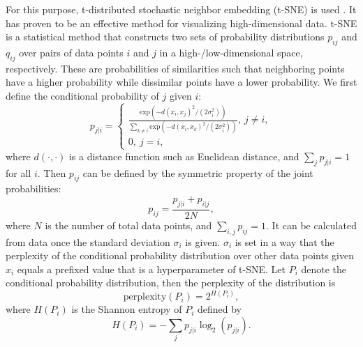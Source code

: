 \documentclass[11pt]{article}
\begin{document}
For this purpose, t-distributed stochastic neighbor embedding (t-SNE) is used \citep{van2008visualizing}. It has proven to be an effective method for visualizing high-dimensional data. t-SNE is a statistical method that constructs two sets of probability distributions $p_{ij}$ and $q_{ij}$ over pairs of data points $i$ and $j$ in a high-/low-dimensional space, respectively. These are probabilities of similarities such that neighboring points have a higher probability while dissimilar points have a lower probability. We first define the conditional probability of $j$ given $i$:
\begin{equation}
    p_{j|i}=
    \begin{cases}\frac{\mathrm{exp}(-d(x_{i},x_{j})^{2}/(2\sigma_{i}^{2}))}{\sum\limits_{k \neq i}\mathrm{exp}(-d(x_{i},x_{k})^{2}/(2\sigma_{i}^{2}))}, \ j \neq i, \\
    0, \ j=i,
    \end{cases}
\end{equation}
where $d(\cdot,\cdot)$ is a distance function such as Euclidean distance, and $\sum\limits_{j} p_{j|i}=1$ for all $i$. Then $p_{ij}$ can be defined by the symmetric property of the joint probabilities:
\begin{equation}
    p_{ij} = \frac{p_{j|i} + p_{i|j}}{2N},
\end{equation}
where $N$ is the number of total data points, and $\sum\limits_{i,j}p_{ij}=1$. It can be calculated from data once the standard deviation $\sigma_{i}$ is given. $\sigma_{i}$ is set in a way that the perplexity of the conditional probability distribution over other data points given $x_{i}$ equals a prefixed value that is a hyperparameter of t-SNE. Let $P_{i}$ denote the conditional probability distribution, then the perplexity of the distribution is
\begin{equation}
    \mathrm{perplexity}(P_{i}) = 2^{H(P_{i})},
\end{equation}
where $H(P_{i})$ is the Shannon entropy of $P_{i}$ defined by
\begin{equation}
    H(P_{i}) = -\sum\limits_{j}p_{j|i}\log_{2}(p_{j|i}).
\end{equation}
\end{document}
